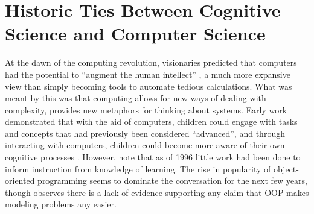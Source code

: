 \documentclass[12pt]{article}
\let\textcite=\autocite
\begin{document}

\section{Historic Ties Between Cognitive Science and Computer Science}
At the dawn of the computing revolution, visionaries predicted that
computers had the potential to “augment the human intellect”
\autocite{engelbart_augmenting_1962}, a much more expansive view than
simply becoming tools to automate tedious calculations. What was meant
by this was that computing allows for new ways of dealing with
complexity, provides new metaphors for thinking about
systems\autocite{kay_history_1996}. Early work demonstrated that with
the aid of computers, children could engage with tasks and concepts
that had previously been considered “advanced”, and through
interacting with computers, children could become more aware of their
own cognitive processes \autocite{papert_mindstorms_1980}. However,
\textcite{east_patternbased_1996} note that as of 1996 little work had
been done to inform instruction from knowledge of learning. The rise
in popularity of object-oriented programming seems to dominate the
conversation for the next few years, though
\textcite{robins_learning_2003} observes there is a lack of evidence
supporting any claim that OOP makes modeling problems any easier.





\end{document}

